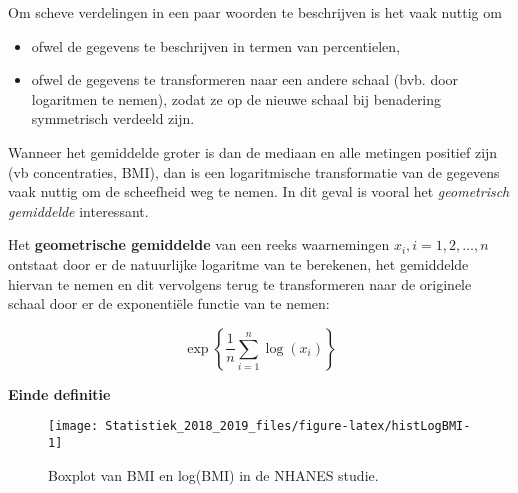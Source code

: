 \documentclass[12pt,dutch,coursenotes]{book}
\newenvironment{Shaded}{\begin{snugshade}}{\end{snugshade}}
\newcommand{\KeywordTok}[1]{\textcolor[rgb]{0.13,0.29,0.53}{\textbf{#1}}}
\newcommand{\DataTypeTok}[1]{\textcolor[rgb]{0.13,0.29,0.53}{#1}}
\newcommand{\DecValTok}[1]{\textcolor[rgb]{0.00,0.00,0.81}{#1}}
\newcommand{\StringTok}[1]{\textcolor[rgb]{0.31,0.60,0.02}{#1}}
\newcommand{\OperatorTok}[1]{\textcolor[rgb]{0.81,0.36,0.00}{\textbf{#1}}}
\newcommand{\NormalTok}[1]{#1}
\providecommand{\tightlist}{%
  \setlength{\itemsep}{0pt}\setlength{\parskip}{0pt}}
\theoremstyle{definition}
\theoremstyle{definition}
\theoremstyle{definition}
\theoremstyle{remark}
\let\BeginKnitrBlock\begin \let\EndKnitrBlock\end
\begin{document}
Om scheve verdelingen in een paar woorden te beschrijven is het vaak
nuttig om

\begin{itemize}
\tightlist
\item
  ofwel de gegevens te beschrijven in termen van percentielen,
\item
  ofwel de gegevens te transformeren naar een andere schaal (bvb. door
  logaritmen te nemen), zodat ze op de nieuwe schaal bij benadering
  symmetrisch verdeeld zijn.
\end{itemize}

Wanneer het gemiddelde groter is dan de mediaan en alle metingen
positief zijn (vb concentraties, BMI), dan is een logaritmische
transformatie van de gegevens vaak nuttig om de scheefheid weg te nemen.
In dit geval is vooral het \emph{geometrisch gemiddelde} interessant.

\BeginKnitrBlock{definition}[geometrisch gemiddelde]
\protect\hypertarget{def:unnamed-chunk-43}{}{\label{def:unnamed-chunk-43}
\iffalse (geometrisch gemiddelde) \fi{} }Het \textbf{geometrische
gemiddelde} van een reeks waarnemingen \(x_i, i=1, 2, \dots, n\)
ontstaat door er de natuurlijke logaritme van te berekenen, het
gemiddelde hiervan te nemen en dit vervolgens terug te transformeren
naar de originele schaal door er de exponentiële functie van te nemen:

\begin{equation*}
\exp\left\{\frac{1}{n} \sum_{i=1}^n \log(x_i)\right\} 
\end{equation*}

\textbf{Einde definitie}
\EndKnitrBlock{definition}

\begin{Shaded}
\end{Shaded}

\begin{figure}

{\centering \texttt{[image: Statistiek\_2018\_2019\_files/figure-latex/histLogBMI-1]} 

}

\caption{Boxplot van BMI en log(BMI) in de NHANES studie.}\label{fig:histLogBMI}
\end{figure}
\end{document}
